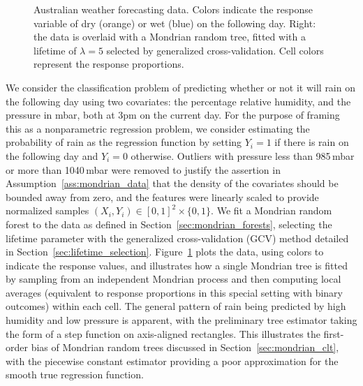 \begin{figure}[t]
\begin{subfigure}{0.49\textwidth}
  \end{subfigure}
  \caption[Australian weather forecasting data]{
    Australian weather forecasting data. Colors indicate the response
    variable of dry (orange) or wet (blue) on the following
    day. Right: the data is overlaid with a Mondrian random tree,
    fitted with a lifetime of $\lambda = 5$
    selected by generalized cross-validation. Cell colors represent the response
  proportions.}
  \label{fig:weather_data}
\end{figure}

We consider the classification problem of predicting whether or not it will
rain on the following day using two covariates: the percentage relative
humidity, and the pressure in mbar, both at 3pm on the current day. For the
purpose of framing this as a nonparametric regression problem, we consider
estimating the probability of rain as the regression function by setting
$Y_i = 1$ if there is rain on the following day and $Y_i = 0$ otherwise.
Outliers with pressure less than 985\,mbar or more than 1040\,mbar were removed
to justify the assertion in Assumption~\ref{ass:mondrian_data} that the density
of the covariates should be bounded away from zero, and the features were
linearly scaled to provide normalized samples
$(X_i, Y_i) \in [0, 1]^2 \times \{0, 1\}$.
We fit a Mondrian random forest to the data as defined in
Section~\ref{sec:mondrian_forests}, selecting the lifetime parameter with the
generalized cross-validation (GCV) method detailed in
Section~\ref{sec:lifetime_selection}. Figure~\ref{fig:weather_data} plots the
data, using colors to indicate the response values, and illustrates how a
single Mondrian tree is fitted by sampling from an independent Mondrian process
and then computing local averages (equivalent to response proportions in this
special setting with binary outcomes) within each cell. The general pattern of
rain being predicted by high humidity and low pressure is apparent, with the
preliminary tree estimator taking the form of a step function on axis-aligned
rectangles. This illustrates the first-order bias of Mondrian random trees
discussed in Section~\ref{sec:mondrian_clt}, with the piecewise constant
estimator providing a poor approximation for the smooth true regression
function.

